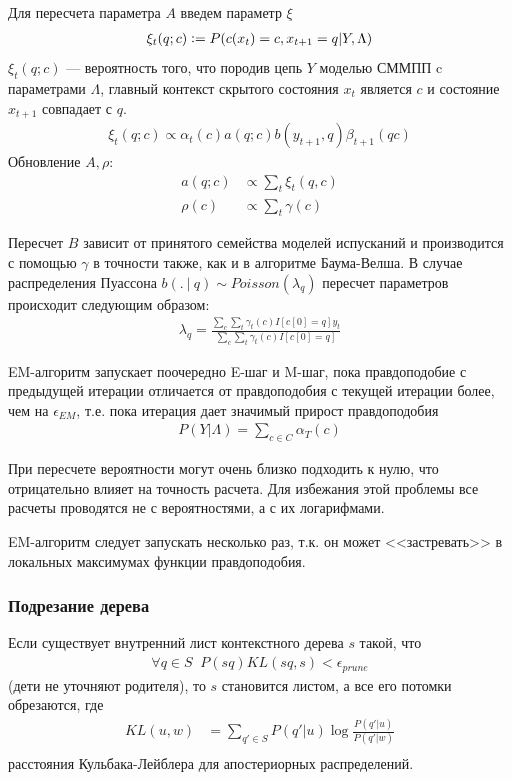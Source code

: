 \documentclass{matmex-diploma-custom}
\begin{document}
\begin{enumerate}
Для пересчета параметра $A$ введем параметр $\xi$
\begin{align*}
\xi_{t}(q;c) \mathrel{\mathop:}= P(c(x_{t})=c, x_{t+1} = q| Y, \Lambda)
\end{align*}
$\xi_{t}(q;c)$ --- вероятность того, что породив цепь $Y$ моделью СММПП c параметрами $\Lambda$, 
главный контекст скрытого состояния $ x_{t} $ является $c$ и состояние $ x_{t+1} $ совпадает с $q$.
\begin{align}
\xi_{t}(q;c) \propto {\alpha_{t}(c)a(q;c)b(y_{t+1},q)\beta_{t+1}(qc)} 
\label{formula:xi}
\end{align}
Обновление $ A , \rho$:
\begin{align}
a(q; c) &\propto \sum_{t}{\xi_{t}(q,c)} 
\label{formula:a}
\\\rho(c) &\propto \sum_{t}{\gamma(c)}
\end{align}

Пересчет $ B $ зависит от принятого семейства моделей испусканий и производится с помощью $ \gamma $ в точности также, как и в алгоритме Баума-Велша.
В случае распределения Пуассона
$b(.~|~q) \sim \textit{Poisson}(\lambda_{q})$ 
пересчет параметров происходит следующим образом:
\begin{align}
\lambda_{q} = \frac{\sum_{c}\sum_{t}{\gamma_{t}(c)I[c[0]=q]y_{t}}}{\sum_{c}\sum_{t}{\gamma_{t}(c)I[c[0]=q]}}
\end{align}
\end{enumerate}
EM-алгоритм запускает поочередно E-шаг и M-шаг, пока правдоподобие с предыдущей итерации отличается от правдоподобия с текущей итерации более, чем на $ \epsilon_{\textit{EM}}$, т.е. пока итерация дает значимый прирост правдоподобия
\begin{align}
P(Y| \Lambda) = \sum_{c \in C}\alpha_{T}(c)
\end{align}

\begin{remark} При пересчете вероятности могут очень близко подходить к нулю, что отрицательно влияет на точность расчета. Для избежания этой проблемы все расчеты проводятся не с вероятностями, а с их логарифмами.
\end{remark}

\begin{remark} EM-алгоритм следует запускать несколько раз, т.к. он может <<застревать>> в локальных максимумах функции правдоподобия.
\end{remark}

\subsubsection{Подрезание дерева} 
Если существует внутренний лист контекстного дерева $ s $ такой, что 
\begin{align}
\forall q \in S \;\; P(sq)\textit{KL}(sq, s) < \epsilon_{\textit{prune}} 
\end{align}
(дети не уточняют родителя), то $ s $ становится листом, а все его потомки обрезаются, где
\begin{align}
\textit{KL}(u, w) &= \sum_{q' \in S} P(q'|u) \log\frac{P(q'|u)}{P(q'|w)}\\
\end{align}
расстояния Кульбака-Лейблера для апостериорных распределений.
\end{document}
